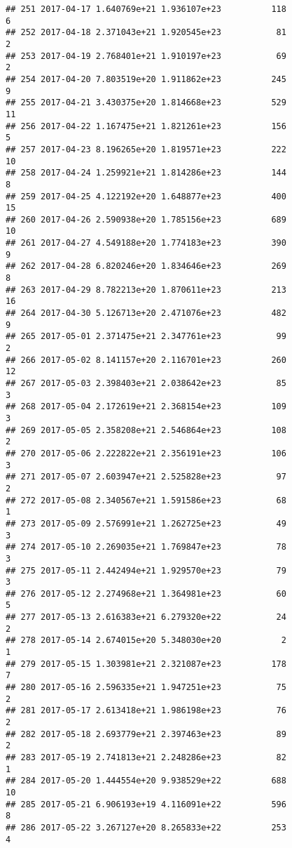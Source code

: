 \documentclass[]{article}
\begin{document}
\begin{verbatim}
## 251 2017-04-17 1.640769e+21 1.936107e+23          118               6
## 252 2017-04-18 2.371043e+21 1.920545e+23           81               2
## 253 2017-04-19 2.768401e+21 1.910197e+23           69               2
## 254 2017-04-20 7.803519e+20 1.911862e+23          245               9
## 255 2017-04-21 3.430375e+20 1.814668e+23          529              11
## 256 2017-04-22 1.167475e+21 1.821261e+23          156               5
## 257 2017-04-23 8.196265e+20 1.819571e+23          222              10
## 258 2017-04-24 1.259921e+21 1.814286e+23          144               8
## 259 2017-04-25 4.122192e+20 1.648877e+23          400              15
## 260 2017-04-26 2.590938e+20 1.785156e+23          689              10
## 261 2017-04-27 4.549188e+20 1.774183e+23          390               9
## 262 2017-04-28 6.820246e+20 1.834646e+23          269               8
## 263 2017-04-29 8.782213e+20 1.870611e+23          213              16
## 264 2017-04-30 5.126713e+20 2.471076e+23          482               9
## 265 2017-05-01 2.371475e+21 2.347761e+23           99               2
## 266 2017-05-02 8.141157e+20 2.116701e+23          260              12
## 267 2017-05-03 2.398403e+21 2.038642e+23           85               3
## 268 2017-05-04 2.172619e+21 2.368154e+23          109               3
## 269 2017-05-05 2.358208e+21 2.546864e+23          108               2
## 270 2017-05-06 2.222822e+21 2.356191e+23          106               3
## 271 2017-05-07 2.603947e+21 2.525828e+23           97               2
## 272 2017-05-08 2.340567e+21 1.591586e+23           68               1
## 273 2017-05-09 2.576991e+21 1.262725e+23           49               3
## 274 2017-05-10 2.269035e+21 1.769847e+23           78               3
## 275 2017-05-11 2.442494e+21 1.929570e+23           79               3
## 276 2017-05-12 2.274968e+21 1.364981e+23           60               5
## 277 2017-05-13 2.616383e+21 6.279320e+22           24               2
## 278 2017-05-14 2.674015e+20 5.348030e+20            2               1
## 279 2017-05-15 1.303981e+21 2.321087e+23          178               7
## 280 2017-05-16 2.596335e+21 1.947251e+23           75               2
## 281 2017-05-17 2.613418e+21 1.986198e+23           76               2
## 282 2017-05-18 2.693779e+21 2.397463e+23           89               2
## 283 2017-05-19 2.741813e+21 2.248286e+23           82               1
## 284 2017-05-20 1.444554e+20 9.938529e+22          688              10
## 285 2017-05-21 6.906193e+19 4.116091e+22          596               8
## 286 2017-05-22 3.267127e+20 8.265833e+22          253               4

\end{verbatim}
\end{document}
